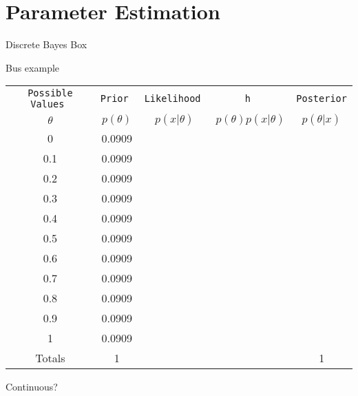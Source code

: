\chapter{Parameter Estimation}

Discrete
Bayes Box

Bus example

\begin{table}
\begin{center}
\begin{tabular}{|c|c|c|c|c|}
\hline
\tt{Possible Values} & \tt{Prior} & \tt{Likelihood} & \tt{h} & \tt{Posterior}\\
$\theta$ & $p(\theta)$ & $p(x|\theta)$ & $p(\theta)p(x|\theta)$ & $p(\theta|x)$\\
\hline
0 & 0.0909 & & &\\
0.1 & 0.0909 & & &\\
0.2 & 0.0909 & & &\\
0.3 & 0.0909 & & &\\
0.4 & 0.0909 & & &\\
0.5 & 0.0909 & & &\\
0.6 & 0.0909 & & &\\
0.7 & 0.0909 & & &\\
0.8 & 0.0909 & & &\\
0.9 & 0.0909 & & &\\
1 & 0.0909 & & &\\
\hline
Totals & 1 & & & 1\\
\hline
\end{tabular}
\end{center}
\end{table}

Continuous?


